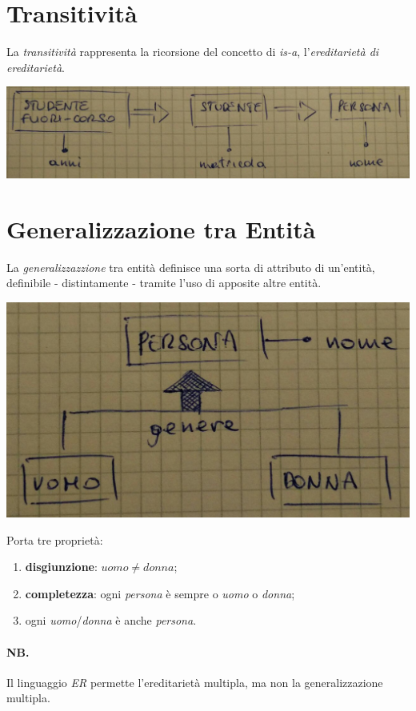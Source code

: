 \section{Transitività}
La \textit{transitività} rappresenta la ricorsione del concetto di \textit{is-a}, l'\textit{ereditarietà di ereditarietà}.
\begin{center}
    \includegraphics[width=.7\textwidth]{res/er-studentefuoricorso-studente-persona.jpg} \hfill
\end{center}

\section{Generalizzazione tra Entità}
La \textit{generalizzazzione} tra entità definisce una sorta di attributo di un'entità, definibile - distintamente - tramite l'uso di apposite altre entità.
\begin{center}
    \includegraphics[width=.5\textwidth]{res/er-persona-uomo-donna.jpg} \hfill
\end{center}
Porta tre proprietà:
\begin{enumerate}
    \item \textbf{disgiunzione}: $uomo \neq donna$;
    \item \textbf{completezza}: ogni \textit{persona} è sempre o \textit{uomo} o \textit{donna};
    \item ogni \textit{uomo}/\textit{donna} è anche \textit{persona}.
\end{enumerate}
\paragraph{NB.}
Il linguaggio \textit{ER} permette l'ereditarietà multipla, ma non la generalizzazione multipla.

